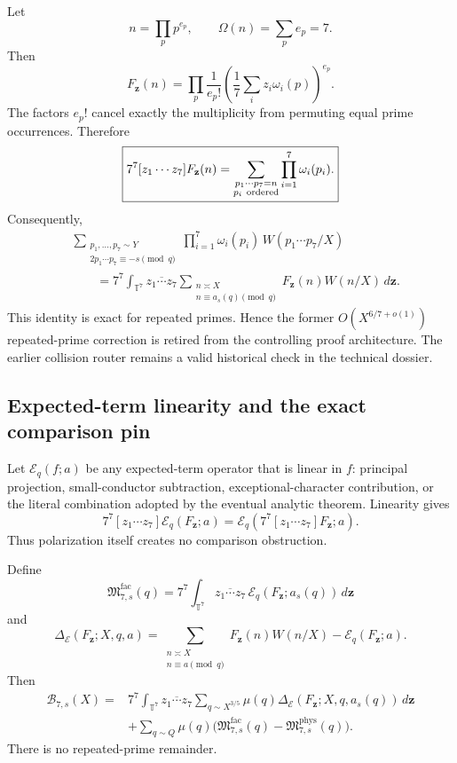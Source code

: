 \documentclass[11pt]{article}
\theoremstyle{definition}
\newcommand{\1}{\mathbf 1}
\newcommand{\B}{\mathcal B}
\begin{document}
{{{Let
\[
n=\prod_pp^{e_p},\qquad\Omega(n)=\sum_pe_p=7.
\]
Then
\[
F_{\mathbf z}(n)=
\prod_p\frac1{e_p!}
\left(\frac17\sum_i z_i\omega_i(p)\right)^{e_p}.
\]
The factors $e_p!$ cancel exactly the multiplicity from permuting equal prime occurrences.
Therefore
\[
\boxed{
7^7[z_1\cdots z_7]F_{\mathbf z}(n)
=
\sum_{\substack{p_1\cdots p_7=n\\p_i\ {\rm ordered}}}
\prod_{i=1}^7\omega_i(p_i).
}
\]
Consequently,
\[
\boxed{
\begin{aligned}
&\sum_{\substack{p_1,\ldots,p_7\sim Y\\
2p_1\cdots p_7\equiv-s\pmod q}}
\prod_{i=1}^7\omega_i(p_i)\,W(p_1\cdots p_7/X)
\\
&\qquad =
7^7\int_{\mathbb T^7}\overline{z_1\cdots z_7}
\sum_{\substack{n\asymp X\\n\equiv a_s(q)\pmod q}}
F_{\mathbf z}(n)W(n/X)\,d\mathbf z .
\end{aligned}}
\]
This identity is exact for repeated primes.  Hence the former
$O(X^{6/7+o(1)})$ repeated-prime correction is retired from the controlling proof
architecture.  The earlier collision router remains a valid historical check in the
technical dossier.

\subsection{Expected-term linearity and the exact comparison pin}

Let $\mathcal E_q(f;a)$ be any expected-term operator that is linear in $f$:
principal projection, small-conductor subtraction, exceptional-character contribution, or
the literal combination adopted by the eventual analytic theorem.  Linearity gives
\[
\boxed{
7^7[z_1\cdots z_7]\mathcal E_q(F_{\mathbf z};a)
=
\mathcal E_q\!\left(7^7[z_1\cdots z_7]F_{\mathbf z};a\right).
}
\]
Thus polarization itself creates no comparison obstruction.

Define
\[
\mathfrak M^{\mathrm{fac}}_{7,s}(q)
=
7^7\int_{\mathbb T^7}\overline{z_1\cdots z_7}\,
\mathcal E_q(F_{\mathbf z};a_s(q))\,d\mathbf z
\]
and
\[
\Delta_{\mathcal E}(F_{\mathbf z};X,q,a)
=
\sum_{\substack{n\asymp X\\n\equiv a\pmod q}}
F_{\mathbf z}(n)W(n/X)-\mathcal E_q(F_{\mathbf z};a).
\]
Then
\[
\boxed{
\begin{aligned}
\B_{7,s}(X)
={}&7^7\int_{\mathbb T^7}\overline{z_1\cdots z_7}
\sum_{q\sim X^{3/5}}\mu(q)
\Delta_{\mathcal E}(F_{\mathbf z};X,q,a_s(q))\,d\mathbf z\\
&+\sum_{q\sim Q}\mu(q)
\bigl(\mathfrak M^{\mathrm{fac}}_{7,s}(q)
-\mathfrak M^{\mathrm{phys}}_{7,s}(q)\bigr).
\end{aligned}}
\]
There is no repeated-prime remainder.

}}}
\end{document}
